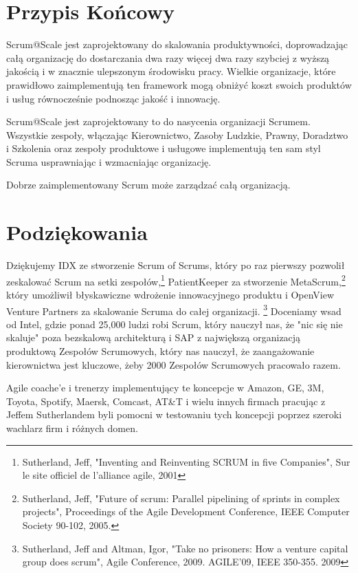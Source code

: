 \documentclass[12pt,a4paper,parskip=full]{scrartcl}
\begin{document}
\section{Przypis Końcowy}

Scrum@Scale jest zaprojektowany do skalowania produktywności, doprowadzając całą organizację do dostarczania dwa razy więcej dwa razy szybciej z wyższą jakością i w znacznie ulepszonym środowisku pracy. Wielkie organizacje, które prawidłowo zaimplementują ten framework mogą obniżyć koszt swoich produktów i usług równocześnie podnosząc jakość i innowację.

Scrum@Scale jest zaprojektowany to do nasycenia organizacji Scrumem. Wszystkie zespoły, włączając Kierownictwo, Zasoby Ludzkie, Prawny, Doradztwo i Szkolenia oraz zespoły produktowe i usługowe implementują ten sam styl Scruma  usprawniając i wzmacniając organizację.

Dobrze zaimplementowany Scrum może zarządzać całą organizacją.

\section{Podziękowania}

Dziękujemy IDX ze stworzenie Scrum of Scrums, który po raz pierwszy pozwolił zeskalować Scrum na setki zespołów,\footnote{Sutherland, Jeff, "Inventing and Reinventing SCRUM in five Companies", Sur le site officiel de l'alliance agile, 2001} PatientKeeper za stworzenie MetaScrum,\footnote{Sutherland, Jeff, "Future of scrum: Parallel pipelining of sprints in complex projects", Proceedings of the Agile Development Conference,  IEEE Computer Society 90-102,  2005.} który umożliwił błyskawiczne wdrożenie innowacyjnego produktu i OpenView Venture Partners za skalowanie Scruma do całej organizacji. \footnote{Sutherland, Jeff and Altman, Igor, "Take no prisoners: How a venture capital group does scrum", Agile Conference, 2009. AGILE'09, IEEE 350-355.  2009} Doceniamy wsad od Intel, gdzie ponad 25,000 ludzi robi Scrum, który nauczył nas, że "nic się nie skaluje" poza bezskalową architekturą i SAP z największą organizacją produktową Zespołów Scrumowych, który nas nauczył, że zaangażowanie kierownictwa jest kluczowe, żeby 2000 Zespołów Scrumowych pracowało razem.

Agile coache'e i trenerzy implementujący te koncepcje w Amazon, GE, 3M, Toyota, Spotify, Maersk, Comcast, AT\&T i wielu innych firmach pracując z Jeffem Sutherlandem byli pomocni w testowaniu tych koncepcji poprzez szeroki wachlarz firm i różnych domen.
\end{document}
